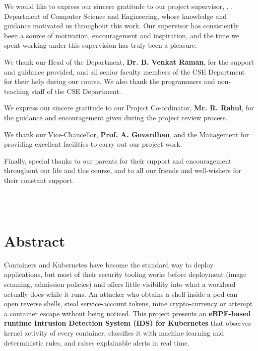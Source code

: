 We would like to express our sincere gratitude to our project supervisor,
\textbf{\supervisor}, \supervisordesig, Department of Computer Science and Engineering,
whose knowledge and guidance motivated us throughout this work. Our supervisor has
consistently been a source of motivation, encouragement and inspiration, and the time
we spent working under this supervision has truly been a pleasure.

We thank our Head of the Department, \textbf{Dr. B. Venkat Raman}, for the support and
guidance provided, and all senior faculty members of the CSE Department for their help
during our course. We also thank the programmers and non-teaching staff of the CSE
Department.

We express our sincere gratitude to our Project Co-ordinator, \textbf{Mr. R. Rahul}, for the guidance and encouragement given during the project review process.

We thank our Vice-Chancellor, \textbf{Prof. A. Govardhan}, and the Management for
providing excellent facilities to carry out our project work.

Finally, special thanks to our parents for their support and encouragement throughout
our life and this course, and to all our friends and well-wishers for their constant
support.

\vspace{1cm}
\begin{flushright}
    \textbf{\studentA}\\
    \textbf{\studentB}\\
    \textbf{\studentC}
\end{flushright}
\clearpage

\chapter*{Abstract}

Containers and Kubernetes have become the standard way to deploy applications, but
most of their security tooling works before deployment (image scanning, admission
policies) and offers little visibility into what a workload actually does while it
runs. An attacker who obtains a shell inside a pod can open reverse shells, steal
service-account tokens, mine crypto-currency or attempt a container escape without
being noticed. This project presents an \textbf{eBPF-based runtime Intrusion Detection
System (IDS) for Kubernetes} that observes kernel activity of every container,
classifies it with machine learning and deterministic rules, and raises explainable
alerts in real time.

